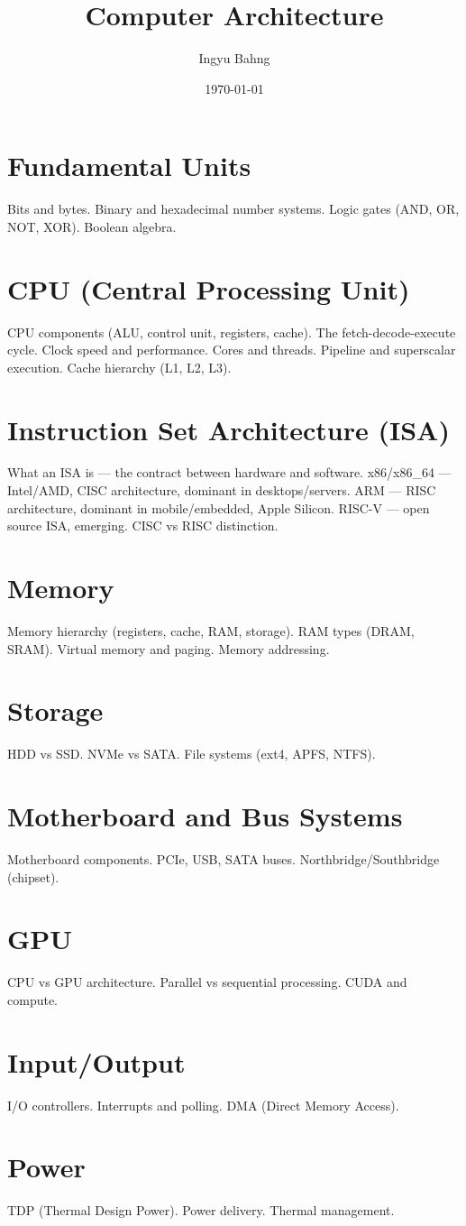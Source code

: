 \documentclass[10pt]{article}
\title{Computer Architecture}
\date{\today}
\author{Ingyu Bahng}
\begin{document}


\section{Fundamental Units}
Bits and bytes.
Binary and hexadecimal number systems.
Logic gates (AND, OR, NOT, XOR).
Boolean algebra.

\section{CPU (Central Processing Unit)}
CPU components (ALU, control unit, registers, cache).
The fetch-decode-execute cycle.
Clock speed and performance.
Cores and threads.
Pipeline and superscalar execution.
Cache hierarchy (L1, L2, L3).

\section{Instruction Set Architecture (ISA)}
What an ISA is --- the contract between hardware and software.
x86/x86\_64 --- Intel/AMD, CISC architecture, dominant in desktops/servers.
ARM --- RISC architecture, dominant in mobile/embedded, Apple Silicon.
RISC-V --- open source ISA, emerging.
CISC vs RISC distinction.

\section{Memory}
Memory hierarchy (registers, cache, RAM, storage).
RAM types (DRAM, SRAM).
Virtual memory and paging.
Memory addressing.

\section{Storage}
HDD vs SSD.
NVMe vs SATA.
File systems (ext4, APFS, NTFS).

\section{Motherboard and Bus Systems}
Motherboard components.
PCIe, USB, SATA buses.
Northbridge/Southbridge (chipset).

\section{GPU}
CPU vs GPU architecture.
Parallel vs sequential processing.
CUDA and compute.

\section{Input/Output}
I/O controllers.
Interrupts and polling.
DMA (Direct Memory Access).

\section{Power}
TDP (Thermal Design Power).
Power delivery.
Thermal management.
  
\end{document}
